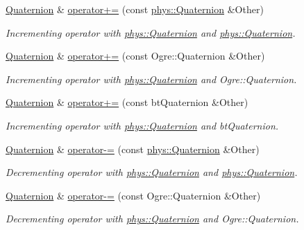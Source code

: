 \begin{DoxyCompactItemize}
\hyperlink{classphys_1_1Quaternion}{Quaternion} \& \hyperlink{classphys_1_1Quaternion_a5d9d2ee516e4e142417b21eecf2e94ce}{operator+=} (const \hyperlink{classphys_1_1Quaternion}{phys::Quaternion} \&Other)
\begin{DoxyCompactList}\small\item\em Incrementing operator with \hyperlink{classphys_1_1Quaternion}{phys::Quaternion} and \hyperlink{classphys_1_1Quaternion}{phys::Quaternion}. \item\end{DoxyCompactList}\item 
\hyperlink{classphys_1_1Quaternion}{Quaternion} \& \hyperlink{classphys_1_1Quaternion_ada6772fd05ec9c8d50b8a25ece3d1c5b}{operator+=} (const Ogre::Quaternion \&Other)
\begin{DoxyCompactList}\small\item\em Incrementing operator with \hyperlink{classphys_1_1Quaternion}{phys::Quaternion} and Ogre::Quaternion. \item\end{DoxyCompactList}\item 
\hyperlink{classphys_1_1Quaternion}{Quaternion} \& \hyperlink{classphys_1_1Quaternion_ab167530770fb0463c5473b5f533db9a8}{operator+=} (const btQuaternion \&Other)
\begin{DoxyCompactList}\small\item\em Incrementing operator with \hyperlink{classphys_1_1Quaternion}{phys::Quaternion} and btQuaternion. \item\end{DoxyCompactList}\item 
\hyperlink{classphys_1_1Quaternion}{Quaternion} \& \hyperlink{classphys_1_1Quaternion_a66086148dd9154e3e3e0b46bacafe0f7}{operator-\/=} (const \hyperlink{classphys_1_1Quaternion}{phys::Quaternion} \&Other)
\begin{DoxyCompactList}\small\item\em Decrementing operator with \hyperlink{classphys_1_1Quaternion}{phys::Quaternion} and \hyperlink{classphys_1_1Quaternion}{phys::Quaternion}. \item\end{DoxyCompactList}\item 
\hyperlink{classphys_1_1Quaternion}{Quaternion} \& \hyperlink{classphys_1_1Quaternion_af62037687eea0005c9fc4a09355656ed}{operator-\/=} (const Ogre::Quaternion \&Other)
\begin{DoxyCompactList}\small\item\em Decrementing operator with \hyperlink{classphys_1_1Quaternion}{phys::Quaternion} and Ogre::Quaternion. \item\end{DoxyCompactList}\item 

\end{DoxyCompactItemize}
